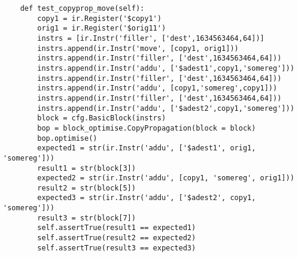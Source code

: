 \begin{lstlisting}
    def test_copyprop_move(self):
        copy1 = ir.Register('$copy1')
        orig1 = ir.Register('$orig11')
        instrs = [ir.Instr('filler', ['dest',1634563464,64])]
        instrs.append(ir.Instr('move', [copy1, orig1]))
        instrs.append(ir.Instr('filler', ['dest',1634563464,64]))
        instrs.append(ir.Instr('addu', ['$adest1',copy1,'somereg']))
        instrs.append(ir.Instr('filler', ['dest',1634563464,64]))
        instrs.append(ir.Instr('addu', [copy1,'somereg',copy1]))
        instrs.append(ir.Instr('filler', ['dest',1634563464,64]))
        instrs.append(ir.Instr('addu', ['$adest2',copy1,'somereg']))
        block = cfg.BasicBlock(instrs)
        bop = block_optimise.CopyPropagation(block = block)
        bop.optimise()
        expected1 = str(ir.Instr('addu', ['$adest1', orig1, 'somereg']))
        result1 = str(block[3])
        expected2 = str(ir.Instr('addu', [copy1, 'somereg', orig1]))
        result2 = str(block[5])
        expected3 = str(ir.Instr('addu', ['$adest2', copy1, 'somereg']))
        result3 = str(block[7])
        self.assertTrue(result1 == expected1)
        self.assertTrue(result2 == expected2)
        self.assertTrue(result3 == expected3)



\end{lstlisting}
